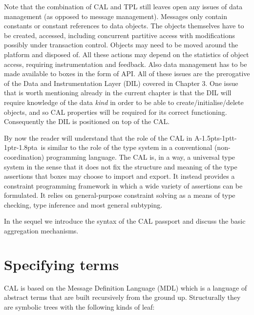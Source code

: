 \documentclass[11pt]{report}
\def\ak{{\textsf{A\kern-1.5pts\kern-1ptt\kern-1ptr\kern-1.8pta}}\kern-2pt{\it K\kern-2ptahn}}
\begin{document}
Note that the combination of CAL and TPL still leaves open any issues of data management (as opposed to message management). Messages only contain constants or constant references to data objects. The objects themselves have to be created, accessed, including concurrent partitive access with modifications possibly under transaction control. Objects may need to be moved around the platform and disposed of. All these actions may depend on the statistics of object access, requiring instrumentation and feedback. Also data management has to be made available to boxes in the form of API. All of these issues are the prerogative of the Data and Instrumentation Layer (DIL) covered in Chapter 3. One issue that is worth mentioning already in the current chapter is that the DIL will require knowledge of the data {\em kind} in order to be able to create/initialise/delete objects, and so CAL properties will be required for its correct functioning. Consequently the DIL is positioned on top of the CAL.

By now the reader will understand that the role of the CAL in \ak\ is similar to the role of the type system in a conventional (non-coordination) programming language. The CAL is, in a way, a universal type system in the sense that it does not fix the structure and meaning of the type assertions that boxes may choose to import and export. It instead provides a constraint programming framework in which a wide variety of assertions can be formulated. It relies on general-purpose constraint solving as a means of type checking, type inference and most general subtyping.

In the sequel we introduce the syntax of the CAL passport and discuss the basic aggregation mechanisms.

\section{Specifying terms}

CAL is based on the Message Definition Language (MDL) which is a language of abstract terms that are built 
recursively from the ground up. Structurally they are symbolic trees with the following kinds of leaf:

\def\true{\hbox{\bf true}}
\def\false{\hbox{\bf false}}
\end{document}
